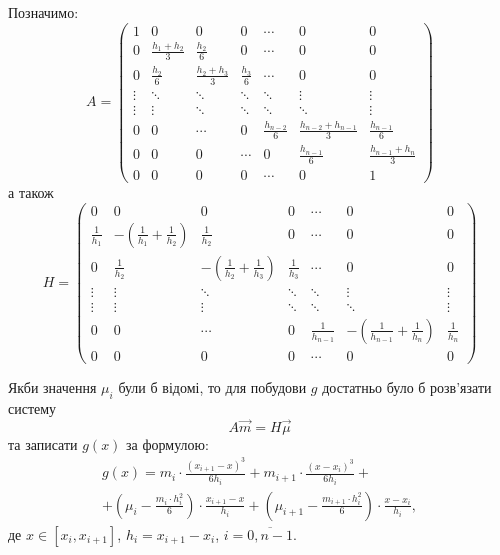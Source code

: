 Позначимо: \[ A = \begin{pmatrix}
    1 & 0 & 0 & 0 & \cdots & 0 & 0 \\
    0 & \frac{h_1 + h_2}{3} & \frac{h_2}{6} & 0 & \cdots & 0 & 0 \\
    0 & \frac{h_2}{6} & \frac{h_2 + h_3}{3} & \frac{h_3}{6} & \cdots & 0 & 0 \\
    \vdots & \ddots & \ddots & \ddots & \ddots & \vdots & \vdots \\
    \vdots & \vdots & \ddots & \ddots & \ddots & \ddots & \vdots \\
    0 & 0 & \cdots & 0 & \frac{h_{n - 2}}{6} & \frac{h_{n - 2} + h_{n - 1}}{3} & \frac{h_{n - 1}}{6} \\
    0 & 0 & 0 & \cdots & 0 & \frac{h_{n - 1}}{6} & \frac{h_{n - 1} + h_n}{3} \\
    0 & 0 & 0 & 0 & \cdots & 0 & 1
\end{pmatrix} \]
а також
\[ H = \begin{pmatrix}
    0 & 0 & 0 & 0 & \cdots & 0 & 0 \\
    \frac{1}{h_1} & - \left( \frac{1}{h_1} + \frac{1}{h_2} \right) & \frac{1}{h_2} & 0 & \cdots & 0 & 0 \\
    0 & \frac{1}{h_2} & - \left( \frac{1}{h_2} + \frac{1}{h_3} \right) & \frac{1}{h_3} & \cdots & 0 & 0 \\
    \vdots & \vdots & \ddots & \ddots & \ddots & \vdots & \vdots \\
    \vdots & \vdots & \vdots & \ddots & \ddots & \ddots & \vdots \\
    0 & 0 & \cdots & 0 & \frac{1}{h_{n - 1}} & - \left( \frac{1}{h_{n - 1}} + \frac{1}{h_n} \right) & \frac{1}{h_n} \\
    0 & 0 & 0 & 0 & \cdots & 0 & 0
\end{pmatrix} \]

Якби значення $\mu_i$ були б відомі, то для побудови $g$ достатньо було б розв'язати систему \begin{equation} \label{amhmu} A \vec m = H \vec \mu \end{equation} та записати $g(x)$ за формулою:
\begin{multline} 
    \label{eq}
    g(x) = m_i \cdot \frac{(x_{i + 1} - x)^3}{6 h_i} + m_{i + 1} \cdot \frac{(x - x_i)^3}{6 h_i} + \\
    + \left( \mu_i - \frac{m_i \cdot h_i^2}{6} \right) \cdot \frac{x_{i + 1} - x}{h_i} + \left( \mu_{i + 1} - \frac{m_{i + 1} \cdot h_i^2}{6}\right) \cdot \frac{x - x_i}{h_i}, 
\end{multline}
де $x \in [x_i, x_{i + 1}]$, $h_i = x_{i + 1} - x_i$, $i = \overline{0, n - 1}$. \medskip

